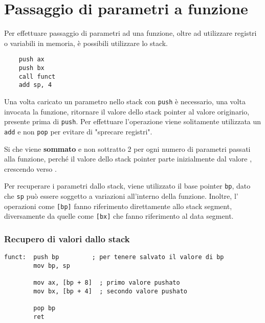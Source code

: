 \documentclass[../template]{subfiles}
\begin{document}
\section{Passaggio di parametri a funzione}
Per effettuare passaggio di parametri ad una funzione, oltre ad utilizzare registri o variabili in memoria, è possibili utilizzare lo stack.
\begin{lstlisting}
    push ax
    push bx
    call funct
    add sp, 4
\end{lstlisting}
Una volta caricato un parametro nello stack con \lstinline{push} è necessario, una volta invocata la funzione, ritornare il valore dello stack pointer al valore originario, presente prima di \lstinline{push}.
Per effettuare l'operazione viene solitamente utilizzata un \lstinline{add} e non \lstinline{pop} per evitare di "sprecare registri".

Si che viene \textbf{sommato} e non sottratto 2 per ogni numero di parametri passati alla funzione, perché il valore dello stack pointer parte inizialmente dal valore , crescendo verso .

Per recuperare i parametri dallo stack, viene utilizzato il base pointer \lstinline{bp}, dato che \lstinline{sp} può essere soggetto a variazioni all'interno della funzione.
Inoltre, l' operazioni come \lstinline{[bp]} fanno riferimento direttamente allo stack segment, diversamente da quelle come \lstinline{[bx]} che fanno riferimento al data segment.

\subsubsection{Recupero di valori dallo stack}
\begin{lstlisting}
funct:  push bp         ; per tenere salvato il valore di bp
        mov bp, sp

        mov ax, [bp + 8]  ; primo valore pushato
        mov bx, [bp + 4]  ; secondo valore pushato

        pop bp
        ret
\end{lstlisting}
\end{document}

